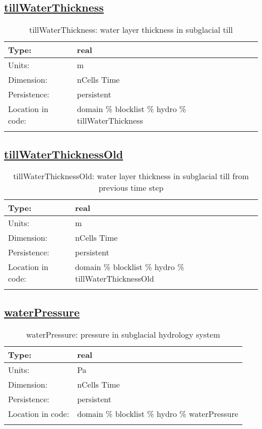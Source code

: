 \subsection[tillWaterThickness]{\hyperref[sec:var_tab_hydro]{tillWaterThickness}}
\label{subsec:var_sec_hydro_tillWaterThickness}
\begin{center}
\begin{longtable}{| p{2.0in} | p{4.0in} |}
        \hline 
        Type: & real \\
        \hline 
        Units: & \si{m} \\
        \hline 
        Dimension: & nCells Time \\
        \hline 
        Persistence: & persistent \\
        \hline 
         Location in code: & domain \% blocklist \% hydro \% tillWaterThickness \\
         \hline 
    \caption{tillWaterThickness: water layer thickness in subglacial till}
\end{longtable}
\end{center}
\subsection[tillWaterThicknessOld]{\hyperref[sec:var_tab_hydro]{tillWaterThicknessOld}}
\label{subsec:var_sec_hydro_tillWaterThicknessOld}
\begin{center}
\begin{longtable}{| p{2.0in} | p{4.0in} |}
        \hline 
        Type: & real \\
        \hline 
        Units: & \si{m} \\
        \hline 
        Dimension: & nCells Time \\
        \hline 
        Persistence: & persistent \\
        \hline 
         Location in code: & domain \% blocklist \% hydro \% tillWaterThicknessOld \\
         \hline 
    \caption{tillWaterThicknessOld: water layer thickness in subglacial till from previous time step}
\end{longtable}
\end{center}
\subsection[waterPressure]{\hyperref[sec:var_tab_hydro]{waterPressure}}
\label{subsec:var_sec_hydro_waterPressure}
\begin{center}
\begin{longtable}{| p{2.0in} | p{4.0in} |}
        \hline 
        Type: & real \\
        \hline 
        Units: & \si{Pa} \\
        \hline 
        Dimension: & nCells Time \\
        \hline 
        Persistence: & persistent \\
        \hline 
         Location in code: & domain \% blocklist \% hydro \% waterPressure \\
         \hline 
    \caption{waterPressure: pressure in subglacial hydrology system}
\end{longtable}
\end{center}
